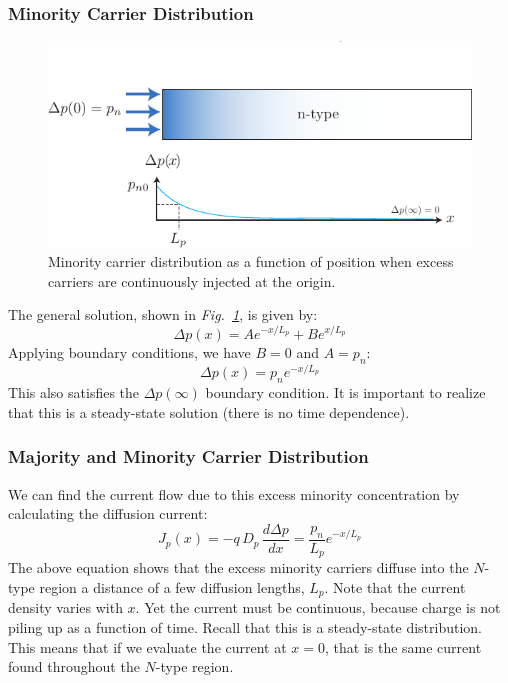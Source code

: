 \subsubsection*{Minority Carrier Distribution}
\begin{figure}[tb]
\centering
\includegraphics[width=\columnwidth]{excess_charge_inject_sol}
\caption{Minority carrier distribution as a function of position when excess carriers are continuously injected at the origin.}
\label{fig:excess_charge_inject_sol}
\end{figure}
The general solution, shown in \emph{Fig.~\ref{fig:excess_charge_inject_sol}}, is given by:
    \begin{equation}
        \Delta p(x) = A e^{-x/L_p} + B e^{x/L_p}
    \end{equation}	
Applying boundary conditions, we have $B = 0$ and $A = p_{n}$:
    \begin{equation}
        \Delta p(x) = p_n e^{-x/L_p} 
    \end{equation}	
This also satisfies the $\Delta p(\infty)$ boundary condition.  It is important to realize that this is a steady-state solution (there is no time dependence).
\subsubsection*{Majority and Minority Carrier Distribution}
We can find the current flow due to this excess minority concentration by calculating the diffusion current:
    \begin{equation}
        J_p(x) = -q\,D_p\,\frac{d \Delta p}{dx} = \frac{p_n}{L_p} e^{-x/L_p}
    \end{equation}	
The above equation shows that the excess minority carriers diffuse into the $N$-type region a distance of a few diffusion lengths, $L_p$.  Note that the current density varies with $x$.  Yet the current must be continuous, because charge is not piling up as a function of time.  Recall that this is a steady-state distribution.  This means that if we evaluate the current at $x = 0$, that is the same current found throughout the $N$-type region.

